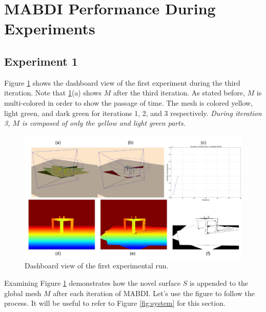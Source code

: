 \section{MABDI Performance During Experiments}
\label{section:results1}

\subsection{Experiment 1}

Figure \ref{fig:run1} shows the dashboard view of the first experiment during
the third iteration. Note that \ref{fig:run1}(a) shows $M$ after the third
iteration. As stated before, $M$ is multi-colored in order to show the passage
of time. The mesh is colored yellow, light green, and dark green for iterations
1, 2, and 3 respectively. \emph{During iteration 3, $M$ is composed of only the
yellow and light green parts.}

\begin{figure}[h]%
\centering
  \includegraphics[width=\textwidth]{figures/diagram_run1.pdf}
  \caption{Dashboard view of the first experimental run.}
  \label{fig:run1}
\end{figure}

Examining Figure \ref{fig:run1} demonstrates how the novel surface
$S$ is appended to the global mesh $M$ after each iteration of MABDI. Let's use
the figure to follow the process. It will be useful to refer to Figure
\ref{fig:system} for this section.

